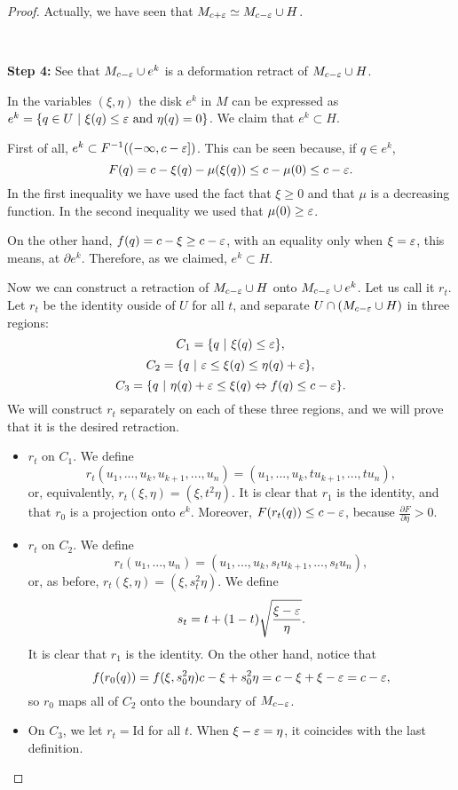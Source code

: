 \begin{proof}
Actually, we have seen that $M_{c+\varepsilon} \simeq M_{c-\varepsilon} \cup H$.

\

{\bf Step 4:} See that $M_{c-\varepsilon} \cup e^k$ is a deformation retract of $M_{c-\varepsilon} \cup H$.

In the variables $(\xi, \eta)$ the disk $e^k$ in $M$ can be expressed as $e^k = \{q \in U \ | \ \xi(q) \leq \e \text{ and } \eta(q) = 0\}$. We claim that $e^k \subset H$.

First of all, $e^k \subset F^{-1}((-\infty,c-\varepsilon])$. This can be seen because, if $q \in e^k$,
\[F(q) = c -\xi(q) - \mu(\xi(q)) \leq c - \mu(0) \leq c - \varepsilon .\]
In the first inequality we have used the fact that $\xi \geq 0$ and that $\mu$ is a decreasing function. In the second inequality we used that $\mu(0) \geq \varepsilon$.

On the other hand, $f(q) = c - \xi \geq c - \varepsilon$, with an equality only when $\xi = \varepsilon$, this means, at $\partial e^k$. Therefore, as we claimed, $e^k \subset H$.

Now we can construct a retraction of $M_{c-\varepsilon} \cup H$ onto $M_{c-\varepsilon} \cup e^k$. Let us call it $r_t$. Let $r_t$ be the identity ouside of $U$ for all $t$, and separate $U \cap \left( M_{c-\varepsilon} \cup H \right)$ in three regions:
\[C_1 = \{ q \ | \ \xi(q) \leq \varepsilon \} ,\]
\[C_2 = \{ q \ | \ \varepsilon \leq \xi(q) \leq \eta(q) + \varepsilon \} ,\]
\[C_3 = \{ q \ | \ \eta(q) + \varepsilon \leq \xi(q) \Leftrightarrow f(q) \leq c - \varepsilon \} .\]
We will construct $r_t$ separately on each of these three regions, and we will prove that it is the desired retraction.

\begin{itemize}
	\item $r_t$ on $C_1$. We define
	\[r_t(u_1,...,u_k,u_{k+1},...,u_n) = (u_1,...,u_k,tu_{k+1},...,tu_n) ,\]
	or, equivalently, $r_t(\xi,\eta) = (\xi,t^2\eta)$. It is clear that $r_1$ is the identity, and that $r_0$ is a projection onto $e^k$. Moreover, $F(r_t(q)) \leq c - \varepsilon$, because $\frac{\partial F}{\partial \eta} > 0$.
	\item $r_t$ on $C_2$. We define
	\[r_t(u_1,...,u_n) = (u_1,...,u_k,s_tu_{k+1},...,s_tu_n) ,\]
	or, as before, $r_t(\xi,\eta) = (\xi, s_t^2 \eta)$. We define
	\[s_t = t + (1-t) \sqrt{\frac{\xi-\varepsilon}{\eta}} .\]
	It is clear that $r_1$ is the identity. On the other hand, notice that
	\[f(r_0(q)) = f(\xi,s_0^2\eta) c - \xi + s_0^2 \eta = c - \xi + \xi - \varepsilon = c -\varepsilon,\]
	so $r_0$ maps all of $C_2$ onto the boundary of $M_{c-\varepsilon}$.
	\item On $C_3$, we let $r_t = \text{Id}$ for all $t$. When $\xi - \varepsilon = \eta$, it coincides with the last definition.
\end{itemize}


\end{proof}
